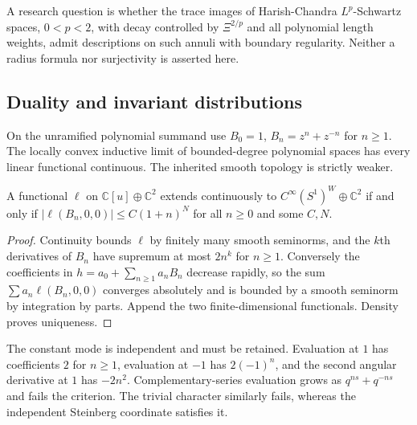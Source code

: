 \begin{center}
\end{center}
A research question is whether the trace images of Harish-Chandra $L^p$-Schwartz spaces, $0<p<2$, with decay controlled by $\Xi^{2/p}$ and all polynomial length weights, admit descriptions on such annuli with boundary regularity. Neither a radius formula nor surjectivity is asserted here.

\subsection{Duality and invariant distributions}
On the unramified polynomial summand use $B_0=1$, $B_n=z^n+z^{-n}$ for $n\ge1$. The locally convex inductive limit of bounded-degree polynomial spaces has every linear functional continuous. The inherited smooth topology is strictly weaker.
\begin{theorem}\label{thm:pwdual}
A functional $\ell$ on $\mathbb C[u]\oplus\mathbb C^2$ extends continuously to $C^\infty(S^1)^W\oplus\mathbb C^2$ if and only if $|\ell(B_n,0,0)|\le C(1+n)^N$ for all $n\ge0$ and some $C,N$.
\end{theorem}
\begin{proof}
Continuity bounds $\ell$ by finitely many smooth seminorms, and the $k$th derivatives of $B_n$ have supremum at most $2n^k$ for $n\ge1$. Conversely the coefficients in $h=a_0+\sum_{n\ge1}a_nB_n$ decrease rapidly, so the sum $\sum a_n\ell(B_n,0,0)$ converges absolutely and is bounded by a smooth seminorm by integration by parts. Append the two finite-dimensional functionals. Density proves uniqueness.
\end{proof}
The constant mode is independent and must be retained. Evaluation at $1$ has coefficients $2$ for $n\ge1$, evaluation at $-1$ has $2(-1)^n$, and the second angular derivative at $1$ has $-2n^2$. Complementary-series evaluation grows as $q^{ns}+q^{-ns}$ and fails the criterion. The trivial character similarly fails, whereas the independent Steinberg coordinate satisfies it.

